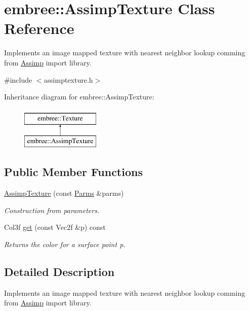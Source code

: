 \hypertarget{classembree_1_1_assimp_texture}{
\section{embree::AssimpTexture Class Reference}
\label{classembree_1_1_assimp_texture}
}


Implements an image mapped texture with nearest neighbor lookup comming from \hyperlink{classembree_1_1_assimp}{Assimp} import library.  




{\ttfamily \#include $<$assimptexture.h$>$}

Inheritance diagram for embree::AssimpTexture:\begin{figure}[H]
\begin{center}
\leavevmode
\includegraphics[height=2.000000cm]{classembree_1_1_assimp_texture}
\end{center}
\end{figure}
\subsection*{Public Member Functions}
\begin{DoxyCompactItemize}
\item 
\hyperlink{classembree_1_1_assimp_texture_a09f96d31e8f620f0d4eaaf0be4a97084}{AssimpTexture} (const \hyperlink{classembree_1_1_parms}{Parms} \&parms)
\begin{DoxyCompactList}\small\item\em Construction from parameters. \item\end{DoxyCompactList}\item 
Col3f \hyperlink{classembree_1_1_assimp_texture_a15cb80b04c8b3440580e8dfb26404e55}{get} (const Vec2f \&p) const 
\begin{DoxyCompactList}\small\item\em Returns the color for a surface point p. \item\end{DoxyCompactList}\end{DoxyCompactItemize}


\subsection{Detailed Description}
Implements an image mapped texture with nearest neighbor lookup comming from \hyperlink{classembree_1_1_assimp}{Assimp} import library. 

